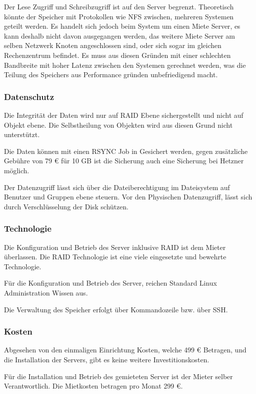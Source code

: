 Der Lese Zugriff und Schreibzugriff ist auf den Server begrenzt. Theoretisch könnte der Speicher mit Protokollen wie NFS zwischen, mehreren Systemen geteilt werden. Es handelt sich jedoch beim System um einen Miete Server, es kann deshalb nicht davon ausgegangen werden, das weitere Miete Server am selben Netzwerk Knoten angeschlossen sind, oder sich sogar im gleichen Rechenzentrum befindet. Es muss aus diesen Gründen mit einer schlechten Bandbreite mit hoher Latenz zwischen den Systemen gerechnet werden, was die Teilung des Speichers aus Performance gründen unbefriedigend macht.

\subsubsection{Datenschutz}
Die Integrität der Daten wird nur auf RAID Ebene sichergestellt und nicht auf Objekt ebene. Die Selbstheilung von Objekten wird aus diesen Grund nicht unterstützt.

Die Daten können mit einen RSYNC Job in Gesichert werden, gegen zusätzliche Gebühre von 79 € für 10 GB ist die Sicherung auch eine Sicherung bei Hetzner möglich.

Der Datenzugriff lässt sich über die Dateiberechtigung im Dateisystem auf Benutzer und Gruppen ebene steuern. Vor den Physischen Datenzugriff, lässt sich durch Verschlüsselung der Disk schützen.

\subsubsection{Technologie}
Die Konfiguration und Betrieb des Server inklusive RAID ist dem Mieter überlassen. Die RAID Technologie ist eine viele eingesetzte und bewehrte Technologie.

Für die Konfiguration und Betrieb des Server, reichen Standard Linux Administration Wissen aus.

Die Verwaltung des Speicher erfolgt über Kommandozeile bzw. über \gls{SSH}.

\subsubsection{Kosten}
Abgesehen von den einmaligen Einrichtung Kosten, welche 499 € Betragen, und die Installation der Servers, gibt es keine weitere Investitionskosten. 

Für die Installation und Betrieb des gemieteten Server ist der Mieter selber Verantwortlich. Die Mietkosten betragen pro Monat 299 €.

